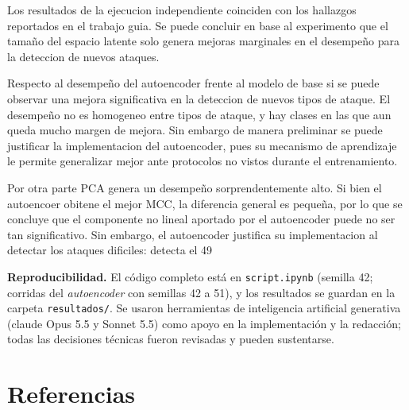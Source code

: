 \documentclass[
  spanish,
  11pt,
]{article}
\begin{document}
\begin{pendiente}
Los resultados de la ejecucion independiente coinciden con  los hallazgos reportados en el trabajo guia. Se puede concluir en base al experimento que el tamaño del espacio latente solo genera mejoras marginales en el desempeño para la deteccion de nuevos ataques.

Respecto al desempeño del autoencoder frente al modelo de base si se puede observar una  mejora significativa en la deteccion de nuevos tipos de ataque. El desempeño no es homogeneo entre tipos de ataque, y hay clases en las que aun queda mucho margen de mejora. Sin embargo de manera preliminar se puede justificar la implementacion del autoencoder, pues su mecanismo de aprendizaje le permite generalizar mejor ante protocolos no vistos durante el entrenamiento. 

Por otra parte PCA genera un desempeño sorprendentemente alto. Si bien el autoencoer obitene el mejor MCC, la diferencia general es pequeña, por lo que se concluye que el componente no lineal aportado por el autoencoder puede no ser tan significativo. Sin embargo, el autoencoder justifica su implementacion al detectar los ataques dificiles:  detecta el 49 %
          
\end{pendiente}

\textbf{Reproducibilidad.} El código completo está en \texttt{script.ipynb} (semilla 42; corridas del
\emph{autoencoder} con semillas 42 a 51), y los resultados se guardan en la carpeta \texttt{resultados/}. Se usaron
herramientas de inteligencia artificial generativa (claude Opus 5.5 y Sonnet 5.5) como apoyo en la implementación y la redacción;
todas las decisiones técnicas fueron revisadas y pueden sustentarse.

\section*{Referencias}\label{referencias}
\end{document}
